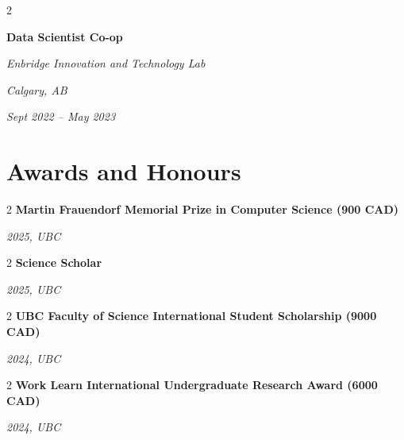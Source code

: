 \documentclass[10pt, letterpaper]{article}
\newenvironment{twocolentry}[2][]{
    \onecolentry
    \def\secondColumn{#2}
    \setcolumnwidth{\fill, 4.5 cm}
    \begin{paracol}{2}
}{
    \switchcolumn \raggedleft \secondColumn
    \end{paracol}
    \endonecolentry
} %
\begin{document}
        
        \begin{twocolentry}{
        \textit{Calgary, AB}    
            
        \textit{Sept 2022 – May 2023}}
            \textbf{Data Scientist Co-op}
            
            \textit{Enbridge Innovation and Technology Lab}
        \end{twocolentry}




    
    \section{Awards and Honours}



        
        \begin{twocolentry}
            {%
            \textit{2025, UBC} %
            }{%
            \textbf{Martin Frauendorf Memorial Prize in Computer Science (900 CAD)}  %
            }
        \end{twocolentry}


        \vspace{0.2 cm}

        \begin{twocolentry}
            {%
            \textit{2025, UBC} %
            }{%
            \textbf{Science Scholar}  %
            }
        \end{twocolentry}


        \vspace{0.2 cm}

        \begin{twocolentry}
            {%
            \textit{2024, UBC} %
            }{%
            \textbf{UBC Faculty of Science International Student Scholarship (9000 CAD)}  %
            }
        \end{twocolentry}


        \vspace{0.2 cm}

        \begin{twocolentry}
            {%
            \textit{2024, UBC} %
            }{%
            \textbf{Work Learn International Undergraduate Research Award (6000 CAD)}  %
            }
        \end{twocolentry}


        \vspace{0.2 cm}
\end{document}
